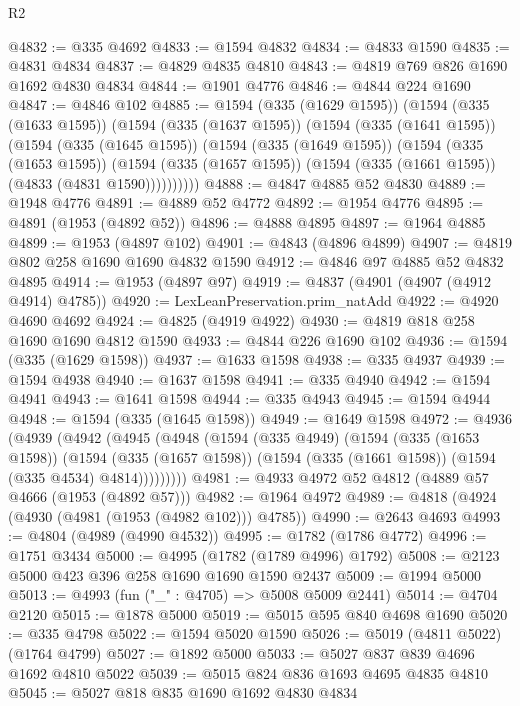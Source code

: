 \begin{lexlean}{R2}
\begin{coremodule}
@4832 := @335 @4692
@4833 := @1594 @4832
@4834 := @4833 @1590
@4835 := @4831 @4834
@4837 := @4829 @4835 @4810
@4843 := @4819 @769 @826 @1690 @1692 @4830 @4834
@4844 := @1901 @4776
@4846 := @4844 @224 @1690
@4847 := @4846 @102
@4885 := @1594
    (@335 (@1629 @1595))
    (@1594
      (@335 (@1633 @1595))
      (@1594
        (@335 (@1637 @1595))
        (@1594
          (@335 (@1641 @1595))
          (@1594
            (@335 (@1645 @1595))
            (@1594
              (@335 (@1649 @1595))
              (@1594
                (@335 (@1653 @1595))
                (@1594
                  (@335 (@1657 @1595))
                  (@1594 (@335 (@1661 @1595)) (@4833 (@4831 @1590))))))))))
@4888 := @4847 @4885 @52 @4830
@4889 := @1948 @4776
@4891 := @4889 @52 @4772
@4892 := @1954 @4776
@4895 := @4891 (@1953 (@4892 @52))
@4896 := @4888 @4895
@4897 := @1964 @4885
@4899 := @1953 (@4897 @102)
@4901 := @4843 (@4896 @4899)
@4907 := @4819 @802 @258 @1690 @1690 @4832 @1590
@4912 := @4846 @97 @4885 @52 @4832 @4895
@4914 := @1953 (@4897 @97)
@4919 := @4837 (@4901 (@4907 (@4912 @4914) @4785))
@4920 := LexLeanPreservation.prim_natAdd
@4922 := @4920 @4690 @4692
@4924 := @4825 (@4919 @4922)
@4930 := @4819 @818 @258 @1690 @1690 @4812 @1590
@4933 := @4844 @226 @1690 @102
@4936 := @1594 (@335 (@1629 @1598))
@4937 := @1633 @1598
@4938 := @335 @4937
@4939 := @1594 @4938
@4940 := @1637 @1598
@4941 := @335 @4940
@4942 := @1594 @4941
@4943 := @1641 @1598
@4944 := @335 @4943
@4945 := @1594 @4944
@4948 := @1594 (@335 (@1645 @1598))
@4949 := @1649 @1598
@4972 := @4936
    (@4939
      (@4942
        (@4945
          (@4948
            (@1594
              (@335 @4949)
              (@1594
                (@335 (@1653 @1598))
                (@1594
                  (@335 (@1657 @1598))
                  (@1594 (@335 (@1661 @1598)) (@1594 (@335 @4534) @4814)))))))))
@4981 := @4933 @4972 @52 @4812 (@4889 @57 @4666 (@1953 (@4892 @57)))
@4982 := @1964 @4972
@4989 := @4818 (@4924 (@4930 (@4981 (@1953 (@4982 @102))) @4785))
@4990 := @2643 @4693
@4993 := @4804 (@4989 (@4990 @4532))
@4995 := @1782 (@1786 @4772)
@4996 := @1751 @3434
@5000 := @4995 (@1782 (@1789 @4996) @1792)
@5008 := @2123 @5000 @423 @396 @258 @1690 @1690 @1590 @2437
@5009 := @1994 @5000
@5013 := @4993 (fun ("_" : @4705) => @5008 @5009 @2441)
@5014 := @4704 @2120
@5015 := @1878 @5000
@5019 := @5015 @595 @840 @4698 @1690
@5020 := @335 @4798
@5022 := @1594 @5020 @1590
@5026 := @5019 (@4811 @5022) (@1764 @4799)
@5027 := @1892 @5000
@5033 := @5027 @837 @839 @4696 @1692 @4810 @5022
@5039 := @5015 @824 @836 @1693 @4695 @4835 @4810
@5045 := @5027 @818 @835 @1690 @1692 @4830 @4834

\end{coremodule}
\end{lexlean}
